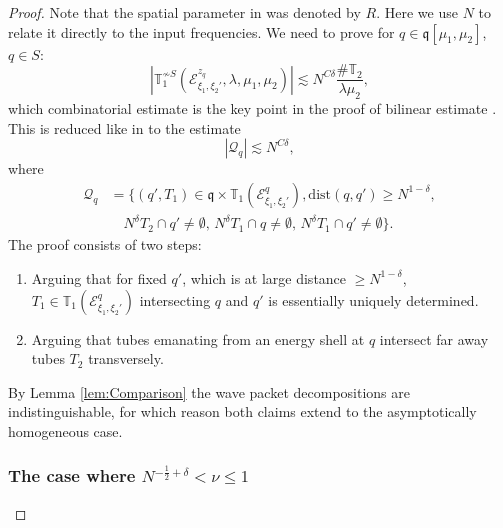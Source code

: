 \documentclass{amsart}
\numberwithin{equation}{section}
\theoremstyle{definition}
\newcommand{\T}{\mathbb{T}}
\begin{document}
\begin{proof}
Note that the spatial parameter in \cite{SchippaTataru2025} was denoted by $R$. Here we use $N$ to relate it directly to the input frequencies.
We need to prove for $q \in \mathfrak{q}[\mu_1,\mu_2]$, $q \in S$:
\begin{equation}
\label{eq:KeyKakeyaBilinear}
| \mathbb{T}_1^{\not\sim S}(\mathcal{E}^{z_q}_{\xi_1,\xi_2'},\lambda,\mu_1,\mu_2)| \lesssim N^{C \delta} \frac{\# \T_2}{\lambda \mu_2},
\end{equation}
which combinatorial estimate is the key point in the proof of bilinear estimate \cite[Eq.~(3.22)]{SchippaTataru2025}. This is reduced like in \cite{SchippaTataru2025} to the estimate
\begin{equation*}
|\mathcal{Q}_q| \lesssim N^{C \delta},
\end{equation*}
where
\begin{equation*}
\begin{split}
\mathcal{Q}_q &= \{ (q',T_1) \in \mathfrak{q} \times \mathbb{T}_1(\mathcal{E}^q_{\xi_1,\xi_2'}), \text{dist}(q,q') \geq N^{1-\delta}, \\
&\quad N^{\delta} T_2 \cap q' \neq \emptyset, \, N^{\delta} T_1 \cap q \neq \emptyset, \, N^{\delta} T_1 \cap q' \neq \emptyset \}.
\end{split}
\end{equation*}
The proof consists of two steps:
\begin{enumerate}
\item Arguing that for fixed $q'$, which is at large distance $\geq N^{1-\delta}$, $T_1 \in \mathbb{T}_1(\mathcal{E}^q_{\xi_1,\xi_2'})$ intersecting $q$ and $q'$ is essentially uniquely determined.
\item Arguing that tubes emanating from an energy shell at $q$ intersect far away tubes $T_2$ transversely.
\end{enumerate}

By Lemma \ref{lem:Comparison} the wave packet decompositions are indistinguishable, for which reason both claims extend to the asymptotically homogeneous case. 

\subsubsection*{The case where $N^{-\frac{1}{2}+\delta}<\nu\leq 1$}


\end{proof}
\end{document}
